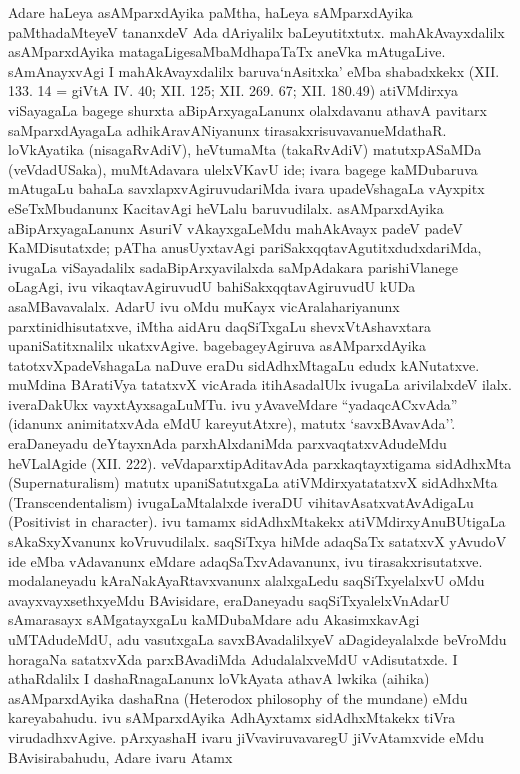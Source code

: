 Adare haLeya asAMparxdAyika paMtha, haLeya sAMparxdAyika paMtha\-daMteyeV tananxdeV Ada dAriyalilx baLeyutitxtutx. mahAkAvayxdalilx asAMparxdAyika matagaLige\break saMbaMdhapaTaTx aneVka mAtugaLive. sAmAnayxvAgi I mahAkAvayxdalilx baruva\break `nAsitxka' eMba shabadxkekx {\rm(XII. 133. 14 =} giVtA {\rm IV. 40; XII. 125; XII. 269. 67; XII. 180.49)} atiVMdirxya viSayagaLa bagege shurxta aBipArxya\-gaLanunx olalx\-davanu athavA pavitarx saMparxdAyagaLa adhikAravANiyanunx tirasakxrisuvavanu\break eMdathaR. loVkAyatika (nisagaRvAdiV), heVtumaMta (takaRvAdiV) matutx\break pASaMDa (veVdadUSaka), muMtAdavara ulelxVKavU ide; ivara bagege kaMDu\-baruva mAtugaLu bahaLa savxlapxvAgiruvudariMda ivara upadeVshagaLa vAyxpitx eSeTxMbu\-danunx KacitavAgi heVLalu baruvudilalx. asAMparxdAyika aBipArxyagaLanunx AsuriV vAkayxgaLeMdu mahAkAvayx padeV padeV KaMDisutatxde; pATha anusUyxtavAgi pariSakxqqta\-vAgutitxdudxdariMda, ivugaLa viSayadalilx sadaBipArxyavilalxda saMpAdakara parishiVlanege oLagAgi, ivu vikaqtavAgiruvudU bahiSakxqqtavAgiruvudU kUDa asaMBavavalalx. AdarU ivu oMdu muKayx vicAralahariyanunx parxtinidhisutatxve, iMtha aidAru daqSiTxgaLu shevxVtAshavxtara upaniSatitxnalilx ukatxvAgive. bagebageyAgiruva asAMparxdAyika tatotxvXpadeVshagaLa naDuve eraDu sidAdhxMtagaLu edudx kANutatxve. muMdina BAratiVya tatatxvX vicArada itihAsadalUlx ivugaLa arivilalxdeV ilalx. iveraDakUkx vayxtAyxsagaLuMTu. ivu yAvaveMdare ``yadaqcACxvAda'' (idanunx animitatxvAda eMdU kareyutAtxre), matutx `savxBAvavAda''. eraDaneyadu deYtayxnAda parxhAlxdaniMda parxvaqtatxvAdudeMdu heVLalAgide {\rm(XII. 222).} veVdaparxtipAditavAda parxkaqtayxtigama sidAdhxMta {\rm(Supernaturalism)} matutx upaniSatutxgaLa atiVMdirxyatatatxvX sidAdhxMta {\rm(Transcendentalism)} ivugaLaMtalalxde iveraDU vihitavAsatxvatAvAdigaLu {\rm(Positivist in character)}. ivu tamamx sidAdhxMtakekx atiVMdirxyAnuBUtigaLa sAkaSxyXvanunx koVruvudilalx. saqSiTxya hiMde adaqSaTx satatxvX yAvudoV ide eMba vAdavanunx eMdare adaqSaTxvAdavanunx, ivu tirasakxrisutatxve. modalaneyadu kAraNakAyaRtavxvanunx alalxgaLedu saqSiTxyelalxvU oMdu avayxvayxsethxyeMdu BAvisidare, eraDaneyadu saqSiTxyalelxVnAdarU sAmarasayx sAMgatayxgaLu kaMDubaMdare adu AkasimxkavAgi uMTAdudeMdU, adu vasutxgaLa savxBAvadalilxyeV aDagideyalalxde beVroMdu horagaNa satatxvXda parxBAvadiMda AdudalalxveMdU vAdisutatxde. I athaRdalilx I dashaRnagaLanunx loVkAyata athavA lwkika (aihika) asAMparxdAyika dashaRna {\rm(Heterodox philosophy of the mundane)} eMdu kareyabahudu. ivu sAMparxdAyika AdhAyxtamx sidAdhxMtakekx tiVra virudadhxvAgive. pArxyashaH ivaru jiVvaviruvavaregU jiVvAtamxvide eMdu BAvisirabahudu, Adare ivaru Atamx 
